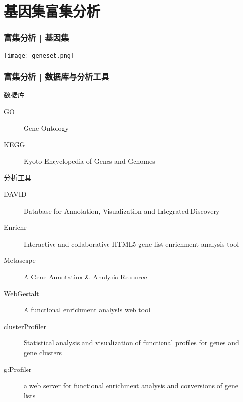 \section{基因集富集分析}
\begin{frame}
  \frametitle{富集分析 | 基因集}
    \begin{center}
      \texttt{[image: geneset.png]}
    \end{center}
\end{frame}

\begin{frame}
  \frametitle{富集分析 | 数据库与分析工具}
  \vspace{-0.5em}
  \begin{block}{数据库}
  \begin{description}
    \item[GO] Gene Ontology
    \item[KEGG] Kyoto Encyclopedia of Genes and Genomes
  \end{description}
  \end{block}
  \pause
  \vspace{-0.5em}
  \begin{block}{分析工具}
  \begin{description}
    \item[DAVID] Database for Annotation, Visualization and Integrated Discovery
    \item[Enrichr] Interactive and collaborative HTML5 gene list enrichment analysis tool
    \item[Metascape] A Gene Annotation \& Analysis Resource
    \item[WebGestalt] A functional enrichment analysis web tool
    \item[clusterProfiler] Statistical analysis and visualization of functional profiles for genes and gene clusters
    \item[g:Profiler] a web server for functional enrichment analysis and conversions of gene lists
  \end{description}
  \end{block}
\end{frame}

